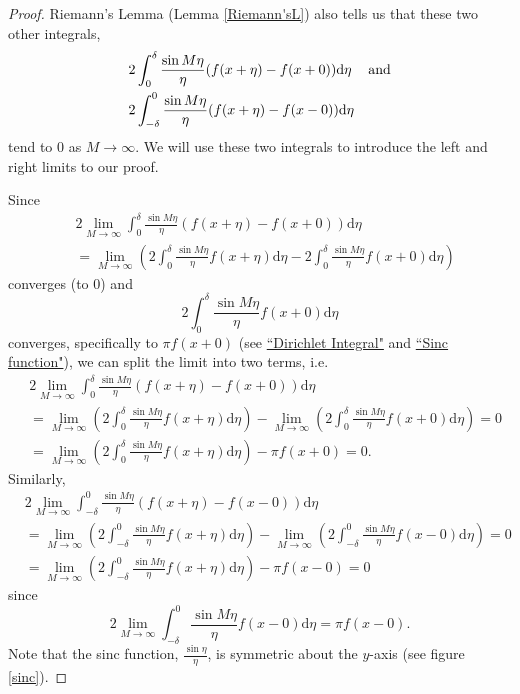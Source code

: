 \begin{proof}
Riemann's Lemma (Lemma \ref{Riemann'sL}) also tells us that these two other integrals,
\begin{align*}
&2\int_{0}^{\delta}\frac{\sin M \eta}{\eta}(f(x + \eta) - f(x+0))\mathrm{d}\eta \hspace{1pc} \mbox{and}\\
&2\int_{-\delta}^{0}\frac{\sin M \eta}{\eta}(f(x + \eta) - f(x-0))\mathrm{d}\eta
\end{align*}
tend to $0$ as $M \rightarrow \infty$. We will use these two integrals to introduce the left and right limits to our proof.

Since
\begin{align*}
&2\lim_{M\rightarrow\infty} \int_{0}^{\delta}\frac{\sin M \eta}{\eta}(f(x + \eta) - f(x+0))\mathrm{d}\eta \\
&= \lim_{M\rightarrow\infty}\left( 2\int_{0}^{\delta}\frac{\sin M \eta}{\eta}f(x + \eta)\mathrm{d}\eta - 2\int_{0}^{\delta}\frac{\sin M \eta}{\eta} f(x+0)\mathrm{d}\eta\right)
\end{align*}
converges (to $0$)  and
$$2\int_{0}^{\delta}\frac{\sin M \eta}{\eta} f(x+0)\mathrm{d}\eta$$ converges, specifically to $\pi f(x+0)$ (see \href{https://en.wikipedia.org/wiki/Dirichlet_integral}{``Dirichlet Integral"} and \href{http://mathworld.wolfram.com/SincFunction.html}{``Sinc function"}),
we can split the limit into two terms, i.e.
\begin{align}
&2\lim_{M\rightarrow\infty} \int_{0}^{\delta}\frac{\sin M \eta}{\eta}(f(x + \eta) - f(x+0))\mathrm{d}\eta \nonumber \\
&= \lim_{M\rightarrow\infty}\left( 2\int_{0}^{\delta}\frac{\sin M \eta}{\eta}f(x + \eta)\mathrm{d}\eta\right) - \lim_{M\rightarrow\infty}\left(2\int_{0}^{\delta}\frac{\sin M \eta}{\eta} f(x+0)\mathrm{d}\eta\right) = 0 \nonumber \\
&= \lim_{M\rightarrow\infty}\left( 2\int_{0}^{\delta}\frac{\sin M \eta}{\eta}f(x + \eta)\mathrm{d}\eta\right) - \pi f(x+0) = 0. \label{limitR}
\end{align}
Similarly,
\begin{align}
&2\lim_{M\rightarrow\infty} \int_{-\delta}^{0}\frac{\sin M \eta}{\eta}(f(x + \eta) - f(x-0))\mathrm{d}\eta \nonumber \\
&= \lim_{M\rightarrow\infty}\left( 2\int_{-\delta}^{0}\frac{\sin M \eta}{\eta}f(x + \eta)\mathrm{d}\eta\right) - \lim_{M\rightarrow\infty}\left(2\int_{-\delta}^{0}\frac{\sin M \eta}{\eta} f(x-0)\mathrm{d}\eta\right) = 0 \nonumber \\
&= \lim_{M\rightarrow\infty}\left( 2\int_{-\delta}^{0}\frac{\sin M \eta}{\eta}f(x + \eta)\mathrm{d}\eta\right) - \pi f(x-0) = 0 \label{limitL}
\end{align}
since
$$2\lim_{M\rightarrow\infty}\int_{-\delta}^{0}\frac{\sin M \eta}{\eta} f(x-0)\mathrm{d}\eta = \pi f(x-0).$$
Note that the sinc function, $\frac{\sin \eta}{\eta}$, is symmetric about the $y$-axis (see figure \ref{sinc}).


\end{proof}
